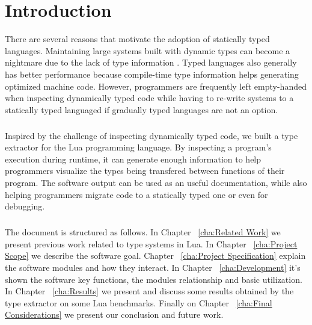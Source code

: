 
\chapter{Introduction}
There are several reasons that motivate the adoption of statically typed languages. Maintaining large systems built with dynamic types can become a nightmare due to the lack of type information \cite{takikawa_is_2016}. Typed languages also generally has better performance because compile-time type information helps generating optimized machine code. However, programmers are frequently left empty-handed when inspecting dynamically typed code while having to re-write systems to a statically typed languaged if gradually typed languages are not an option.
\paragraph*{}
Inspired by the challenge of inspecting dynamically typed code, we built a type extractor for the Lua programming language. By inspecting a program's execution during runtime, it can generate enough information to help programmers visualize the types being transfered between functions of their program. The software output can be used as an useful documentation, while also helping programmers migrate code to a statically typed one or even for debugging.
\paragraph*{}
The document is structured as follows. In Chapter ~\ref{cha:Related Work} we present previous work related to type systems in Lua. In Chapter ~\ref{cha:Project Scope} we describe the software goal. Chapter ~\ref{cha:Project Specification} explain the software modules and how they interact. In Chapter ~\ref{cha:Development} it's shown the software key functions, the modules relationship and basic utilization. In Chapter ~\ref{cha:Results} we present and discuss some results obtained by the type extractor on some Lua benchmarks. Finally on Chapter ~\ref{cha:Final Considerations} we present our conclusion and future work.




